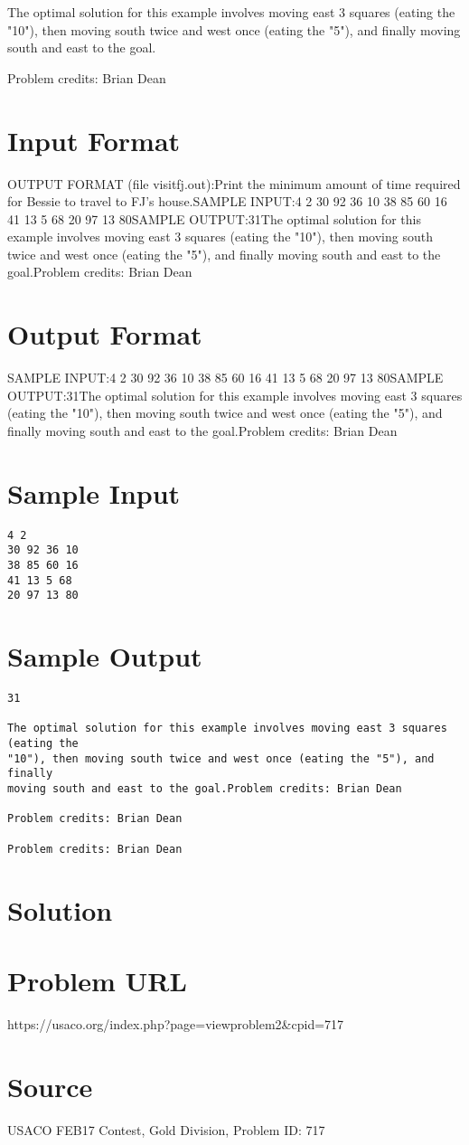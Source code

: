 \documentclass[12pt]{article}
\begin{document}
The optimal solution for this example involves moving east 3 squares (eating the
"10"), then moving south twice and west once (eating the "5"), and finally
moving south and east to the goal.


Problem credits: Brian Dean



\section*{Input Format}
OUTPUT FORMAT (file visitfj.out):Print the minimum amount of time required for Bessie to travel to FJ's house.SAMPLE INPUT:4 2
30 92 36 10
38 85 60 16
41 13 5 68
20 97 13 80SAMPLE OUTPUT:31The optimal solution for this example involves moving east 3 squares (eating the
"10"), then moving south twice and west once (eating the "5"), and finally
moving south and east to the goal.Problem credits: Brian Dean

\section*{Output Format}
SAMPLE INPUT:4 2
30 92 36 10
38 85 60 16
41 13 5 68
20 97 13 80SAMPLE OUTPUT:31The optimal solution for this example involves moving east 3 squares (eating the
"10"), then moving south twice and west once (eating the "5"), and finally
moving south and east to the goal.Problem credits: Brian Dean

\section*{Sample Input}
\begin{verbatim}
4 2
30 92 36 10
38 85 60 16
41 13 5 68
20 97 13 80
\end{verbatim}

\section*{Sample Output}
\begin{verbatim}
31

The optimal solution for this example involves moving east 3 squares (eating the
"10"), then moving south twice and west once (eating the "5"), and finally
moving south and east to the goal.Problem credits: Brian Dean

Problem credits: Brian Dean

Problem credits: Brian Dean
\end{verbatim}

\section*{Solution}


\section*{Problem URL}
https://usaco.org/index.php?page=viewproblem2&cpid=717

\section*{Source}
USACO FEB17 Contest, Gold Division, Problem ID: 717
\end{document}
